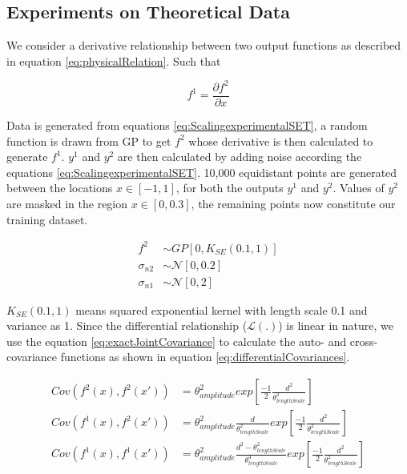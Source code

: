 \subsection{Experiments on Theoretical Data}\label{sub:ScaleexperimentsSyntheticData}
We consider a derivative relationship between two output functions as described in equation \ref{eq:physicalRelation}. Such that 

\begin{equation}\label{eq:derivativeEquation}
   f^1 = \frac{\partial f^2}{\partial x} 
\end{equation}

Data is generated from equations \ref{eq:ScalingexperimentalSET}, a random function is drawn from GP to get \(f^{2}\) whose derivative is then calculated to generate \(f^{1}\). \(y^{1}\) and \(y^{2}\) are then calculated by adding noise according the  equations \ref{eq:ScalingexperimentalSET}. 10,000 equidistant points are generated between the locations $x \in [-1, 1]$, for both the outputs \(y^{1}\) and \(y^{2}\). Values of \(y^{2}\) are masked in the region \(x \in [0, 0.3]\), the remaining points now constitute our training dataset. 

\begin{equation}\label{eq:ScalingexperimentalSET}
    \begin{aligned}
    f^{2} & \sim  GP[0, K_{SE}(0.1, 1)] \\
\sigma_{n2} & \sim \mathcal{N}[0, 0.2] \\
\sigma_{n1} & \sim \mathcal{N}[0, 2]
    \end{aligned}
\end{equation}

\(K_{SE}(0.1, 1)\) means squared exponential kernel with length scale 0.1 and variance as 1. Since the differential relationship (\(\mathcal{L}(.)\)) is linear in nature, we use the equation \ref{eq:exactJointCovariance} to calculate the auto- and cross-covariance functions as shown in equation \ref{eq:differentialCovariances}.

\begin{equation}\label{eq:differentialCovariances}
    \begin{aligned}
Cov(f^2(x), f^2(x')) & = \theta_{amplitude}^{2}exp \left [\frac{-1}{2}\frac{d^{2}}{\theta_{lengthScale}^2} \right] \\    
Cov(f^1(x), f^2(x')) & = \theta_{amplitude}^{2}\frac{d}{\theta_{lengthScale}^2}exp\left [\frac{-1}{2}\frac{d^{2}}{\theta_{lengthScale}^2}\right] \\
Cov(f^1(x), f^1(x')) & = \theta_{amplitude}^{2}\frac{d^{2}-\theta_{lengthScale}^{2}}{\theta_{lengthScale}^{4}}exp\left [\frac{-1}{2}\frac{d^{2}}{\theta_{lengthScale}^{2}}\right]
    \end{aligned}
\end{equation}

